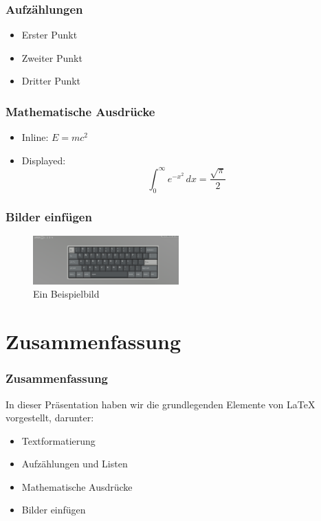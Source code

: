 \documentclass{beamer}
\begin{document}
\begin{frame}
\frametitle{Aufzählungen}
\begin{itemize}
    \item Erster Punkt
    \item Zweiter Punkt
    \item Dritter Punkt
\end{itemize}
\end{frame}

\begin{frame}
\frametitle{Mathematische Ausdrücke}
\begin{itemize}
    \item Inline: \(E = mc^2\)
    \item Displayed:
    \[
    \int_0^\infty e^{-x^2} \, dx = \frac{\sqrt{\pi}}{2}
    \]
\end{itemize}
\end{frame}

\begin{frame}
\frametitle{Bilder einfügen}
\begin{figure}
    \centering
    \includegraphics[width=0.5\textwidth]{sample}
    \caption{Ein Beispielbild}
\end{figure}
\end{frame}

\section{Zusammenfassung}

\begin{frame}
\frametitle{Zusammenfassung}
In dieser Präsentation haben wir die grundlegenden Elemente von LaTeX vorgestellt, darunter:
\begin{itemize}
    \item Textformatierung
    \item Aufzählungen und Listen
    \item Mathematische Ausdrücke
    \item Bilder einfügen
\end{itemize}
\end{frame}
\end{document}
